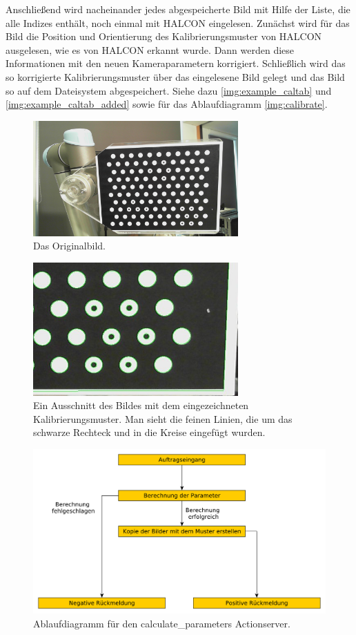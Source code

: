 Anschließend wird nacheinander jedes abgespeicherte Bild mit Hilfe der Liste, die alle Indizes enthält, noch einmal mit HALCON eingelesen. Zunächst wird für das Bild die Position und Orientierung des Kalibrierungsmuster von HALCON ausgelesen, wie es von HALCON erkannt wurde. Dann werden diese Informationen mit den neuen Kameraparametern korrigiert. Schließlich wird das so korrigierte Kalibrierungsmuster über das eingelesene Bild gelegt und das Bild so auf dem Dateisystem abgespeichert. Siehe dazu \autoref{img:example_caltab} und \autoref{img:example_caltab_added} sowie für das Ablaufdiagramm \autoref{img:calibrate}.
\begin{figure}[h]
\centering
\includegraphics[width=0.7\textwidth]{images/13}
\caption{Das Originalbild.}\label{img:example_caltab}
\end{figure}
\begin{figure}[h]
\centering
\includegraphics[width=0.7\textwidth]{images/13_added}
\caption{Ein Ausschnitt des Bildes mit dem eingezeichneten Kalibrierungsmuster. Man sieht die feinen Linien, die um das schwarze Rechteck und in die Kreise eingefügt wurden.}\label{img:example_caltab_added}
\end{figure}
\begin{figure}[h]
\centering
\includegraphics[width=\textwidth]{images/calibrate}
\caption{Ablaufdiagramm für den calculate\_parameters Actionserver.}\label{img:calibrate}
\end{figure}

